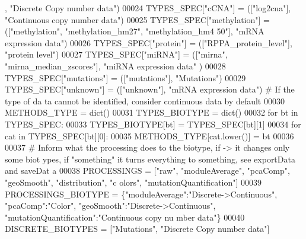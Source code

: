 \begin{DoxyCode}
      , \textcolor{stringliteral}{"Discrete Copy number data"})
00024 TYPES\_SPEC[\textcolor{stringliteral}{"cCNA"}] = ([\textcolor{stringliteral}{"log2cna"}], \textcolor{stringliteral}{"Continuous copy number data"})
00025 TYPES\_SPEC[\textcolor{stringliteral}{"methylation"}] = ([\textcolor{stringliteral}{"methylation"}, \textcolor{stringliteral}{"methylation\_hm27"}, \textcolor{stringliteral}{"methylation\_hm4
      50"}], \textcolor{stringliteral}{"mRNA expression data"})
00026 TYPES\_SPEC[\textcolor{stringliteral}{"protein"}] = ([\textcolor{stringliteral}{"RPPA\_protein\_level"}], \textcolor{stringliteral}{"protein level"})
00027 TYPES\_SPEC[\textcolor{stringliteral}{"miRNA"}] = ([\textcolor{stringliteral}{"mirna"}, \textcolor{stringliteral}{"mirna\_median\_zscores"}], \textcolor{stringliteral}{"miRNA expression data"
      })
00028 TYPES\_SPEC[\textcolor{stringliteral}{"mutations"}] = ([\textcolor{stringliteral}{"mutations"}], \textcolor{stringliteral}{"Mutations"})
00029 TYPES\_SPEC[\textcolor{stringliteral}{"unknown"}] = ([\textcolor{stringliteral}{"unknown"}], \textcolor{stringliteral}{"mRNA expression data"}) \textcolor{comment}{# If the type of da
      ta cannot be identified, consider continuous data by default}
00030 METHODS\_TYPE = dict()
00031 TYPES\_BIOTYPE = dict()
00032 \textcolor{keywordflow}{for} bt \textcolor{keywordflow}{in} TYPES\_SPEC:
00033     TYPES\_BIOTYPE[bt] = TYPES\_SPEC[bt][1]
00034     \textcolor{keywordflow}{for} cat \textcolor{keywordflow}{in} TYPES\_SPEC[bt][0]:
00035         METHODS\_TYPE[cat.lower()] = bt
00036 
00037 \textcolor{comment}{# Inform what the processing does to the biotype, if -> it changes only some biot
      ypes, if "something" it turns everything to something, see exportData and saveDat
      a}
00038 PROCESSINGS = [\textcolor{stringliteral}{"raw"}, \textcolor{stringliteral}{"moduleAverage"}, \textcolor{stringliteral}{"pcaComp"}, \textcolor{stringliteral}{"geoSmooth"}, \textcolor{stringliteral}{"distribution"}, \textcolor{stringliteral}{"c
      olors"}, \textcolor{stringliteral}{"mutationQuantification"}]
00039 PROCESSINGS\_BIOTYPE = \{\textcolor{stringliteral}{"moduleAverage"}:\textcolor{stringliteral}{"Discrete->Continuous"}, \textcolor{stringliteral}{"pcaComp"}:\textcolor{stringliteral}{"Color"},
       \textcolor{stringliteral}{"geoSmooth"}:\textcolor{stringliteral}{"Discrete->Continuous"}, \textcolor{stringliteral}{"mutationQuantification"}:\textcolor{stringliteral}{"Continuous copy nu
      mber data"}\}
00040 DISCRETE\_BIOTYPES = [\textcolor{stringliteral}{"Mutations"}, \textcolor{stringliteral}{"Discrete Copy number data"}]

\end{DoxyCode}
